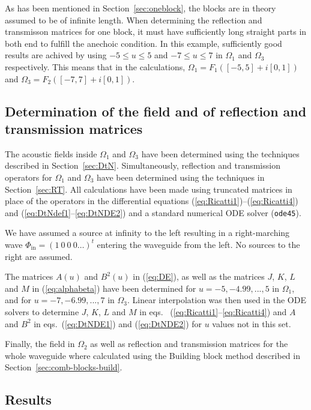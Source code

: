 \documentclass[numreferences]{kluwer}
\renewcommand{\Phi}{\varPhi}
\renewcommand{\vec}[1]{\bm{#1}}
\renewcommand{\Phi}{\varPhi}
\begin{document}
As has been mentioned in Section~\ref{sec:oneblock}, the blocks are in
theory assumed to be of infinite length. When determining the
reflection and transmisson matrices for one block, it must have
sufficiently long straight parts in both end to fulfill the anechoic
condition. In this example, sufficiently good results are achived by
using $-5\le u\le5$ and $-7\le u\le7$ in $\Omega_1$ and $\Omega_3$
respectively. This means that in the calculations,
$\Omega_1=F_1([-5,5]+i[0,1])$ and $\Omega_3=F_2([-7,7]+i[0,1])$.

\subsection{Determination of the field and of reflection and
transmission matrices}
\label{sec:determ-field-refl}

The acoustic fields inside $\Omega_1$ and $\Omega_3$ have been
determined using the techniques described in
Section~\ref{sec:DtN}. Simultaneously, reflection and transmission
operators for $\Omega_1$ and $\Omega_3$ have been determined using the
techniques in Section~\ref{sec:RT}. All calculations have been made
using %
truncated matrices in place of the operators in the
differential equations (\ref{eq:Ricatti1})--(\ref{eq:Ricatti4}) and
(\ref{eq:DtNdef1}--\ref{eq:DtNDE2}) and a standard numerical ODE
solver (\verb+ode45+).

We have assumed a source at infinity to the left resulting in a
right-marching wave $\vec\Phi_{\text{in}}=(1\ 0\ 0\ 0\dots)^t$
entering the waveguide from the left. No sources to the right are
assumed.

The matrices $A(u)$ and $B^2(u)$ in (\ref{eq:DE}), as well as the
matrices $J$, $K$, $L$ and $M$ in (\ref{eq:alphabeta}) have been
determined for $u=-5,-4.99,...,5$ in $\Omega_1$, and for
$u=-7,-6.99,...,7$ in $\Omega_3$. Linear interpolation was then used
in the ODE solvers to determine $J$, $K$, $L$ and $M$ in
eqs. ~(\ref{eq:Ricatti1}--\ref{eq:Ricatti4}) and $A$ and $B^2$ in
eqs.~(\ref{eq:DtNDE1}) and (\ref{eq:DtNDE2}) for $u$ values not in
this set.

Finally, the field in $\Omega_2$ as well as reflection and
transmission matrices for the whole waveguide where calculated using
the Building block method described in
Section~\ref{sec:comb-blocks-build}.

\subsection{Results}
\label{sec:results}
\end{document}
